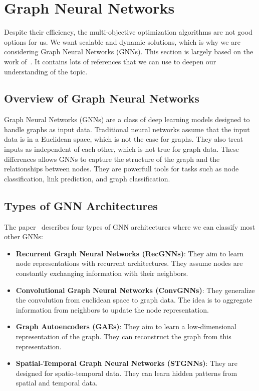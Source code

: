 \documentclass[conference]{IEEEtran}
\begin{document}
    \section{Graph Neural Networks}\label{sec:graph-neural-networks}
    Despite their efficiency, the multi-objective optimization algorithms are not good options for us.
    We want scalable and dynamic solutions, which is why we are considering Graph Neural Networks (GNNs).
    This section is largely based on the work of~\cite{Wu_2021}.
    It contains lots of references that we can use to deepen our understanding of the topic.

    \subsection{Overview of Graph Neural Networks}\label{subsec:overview-of-graph-neural-networks}
    Graph Neural Networks (GNNs) are a class of deep learning models designed to handle graphs as input data.
    Traditional neural networks assume that the input data is in a Euclidean space, which is not the case for graphs.
    They also treat inputs as independent of each other, which is not true for graph data.
    These differences allows GNNs to capture the structure of the graph and the relationships between nodes.
    They are powerfull tools for tasks such as node classification, link prediction, and graph classification.

    \subsection{Types of GNN Architectures}\label{subsec:types-of-gnn-architectures}
    The paper~\cite{Wu_2021} describes four types of GNN architectures where we can classify most other GNNs:

    \begin{itemize}
        \item \textbf{Recurrent Graph Neural Networks (RecGNNs)}:
        They aim to learn node representations with recurrent architectures.
        They assume nodes are constantly exchanging information with their neighbors.
        \item \textbf{Convolutional Graph Neural Networks (ConvGNNs)}:
        They generalize the convolution from euclidean space to graph data.
        The idea is to aggregate information from neighbors to update the node representation.
        \item \textbf{Graph Autoencoders (GAEs)}:
        They aim to learn a low-dimensional representation of the graph.
        They can reconstruct the graph from this representation.
        \item \textbf{Spatial-Temporal Graph Neural Networks (STGNNs)}:
        They are designed for spatio-temporal data.
        They can learn hidden patterns from spatial and temporal data.
    \end{itemize}
\end{document}
